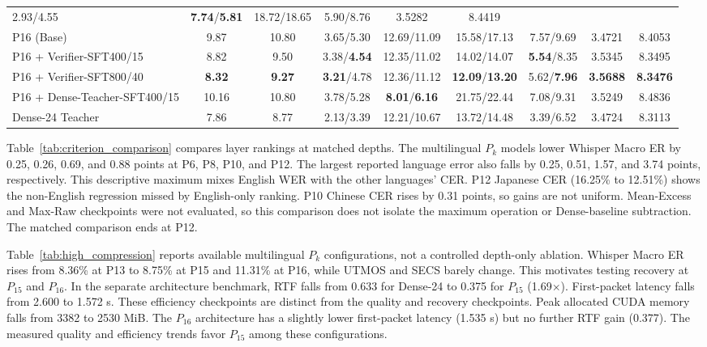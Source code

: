 \documentclass{article}
\begin{document}
\begin{table}[!t]
\begin{tabular}{lcccccccc}
2.93/4.55 & \textbf{7.74}/\textbf{5.81} & 18.72/18.65 & 5.90/8.76 & 3.5282 & 8.4419 \\
\addlinespace
P16 (Base) & 9.87 & 10.80 &
3.65/5.30 & 12.69/11.09 & 15.58/17.13 & 7.57/9.69 & 3.4721 & 8.4053 \\
P16 + Verifier-SFT400/15 & 8.82 & 9.50 &
3.38/\textbf{4.54} & 12.35/11.02 & 14.02/14.07 & \textbf{5.54}/8.35 & 3.5345 & 8.3495 \\
P16 + Verifier-SFT800/40 & \textbf{8.32} & \textbf{9.27} &
\textbf{3.21}/4.78 & 12.36/11.12 & \textbf{12.09}/\textbf{13.20} & 5.62/\textbf{7.96} & \textbf{3.5688} & \textbf{8.3476} \\
P16 + Dense-Teacher-SFT400/15 & 10.16 & 10.80 &
3.78/5.28 & \textbf{8.01}/\textbf{6.16} & 21.75/22.44 & 7.08/9.31 & 3.5249 & 8.4836 \\
\addlinespace
Dense-24 Teacher & 7.86 & 8.77 &
2.13/3.39 & 12.21/10.67 & 13.72/14.48 & 3.39/6.52 & 3.4724 & 8.3113 \\
\bottomrule
\end{tabular}
\end{table}

\setlength{\dbltextfloatsep}{8pt plus 2pt minus 2pt}

Table~\ref{tab:criterion_comparison} compares layer rankings at
matched depths. The multilingual \(P_k\) models lower Whisper Macro ER
by 0.25, 0.26, 0.69, and 0.88 points at P6, P8, P10, and P12.
The largest reported language error also falls by 0.25, 0.51, 1.57,
and 3.74 points, respectively. This descriptive maximum mixes English
WER with the other languages' CER. P12 Japanese CER (16.25\% to
12.51\%) shows the non-English regression missed by English-only
ranking. P10 Chinese CER rises by 0.31 points, so gains are not
uniform. Mean-Excess and Max-Raw checkpoints were not evaluated, so
this comparison does not isolate the maximum operation or
Dense-baseline subtraction. The matched comparison ends at P12.

Table~\ref{tab:high_compression} reports available multilingual
\(P_k\) configurations, not a controlled depth-only ablation.
Whisper Macro ER rises from 8.36\% at P13 to 8.75\% at P15 and
11.31\% at P16, while UTMOS and SECS barely change. This motivates
testing recovery at \(P_{15}\) and \(P_{16}\). In the separate
architecture benchmark, RTF falls from 0.633 for Dense-24 to 0.375
for \(P_{15}\) (1.69$\times$). First-packet latency falls from 2.600
to 1.572 s. These efficiency checkpoints are distinct from the
quality and recovery checkpoints. Peak allocated CUDA memory falls
from 3382 to 2530 MiB. The \(P_{16}\) architecture has a slightly
lower first-packet latency (1.535 s) but no further RTF gain (0.377).
The measured quality and efficiency trends favor \(P_{15}\) among
these configurations.
\end{document}
